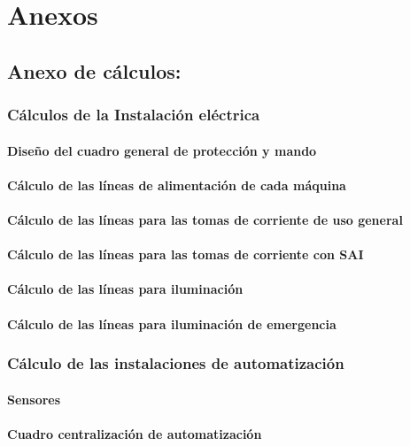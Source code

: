 \newpage \section{Anexos}

   
\subsection{Anexo de cálculos:}

\subsubsection{Cálculos de la Instalación eléctrica}
\paragraph{Diseño del cuadro general de protección y mando}
\paragraph{Cálculo de las líneas de alimentación de cada máquina}
\paragraph{Cálculo de las líneas para las tomas de corriente de uso general}
\paragraph{Cálculo de las líneas para las tomas de corriente con SAI}
\paragraph{Cálculo de las líneas para iluminación}
\paragraph{Cálculo de las líneas para iluminación de emergencia}

\subsubsection{Cálculo de las instalaciones de automatización}
\paragraph{Sensores }
\paragraph{Cuadro centralización de automatización}
